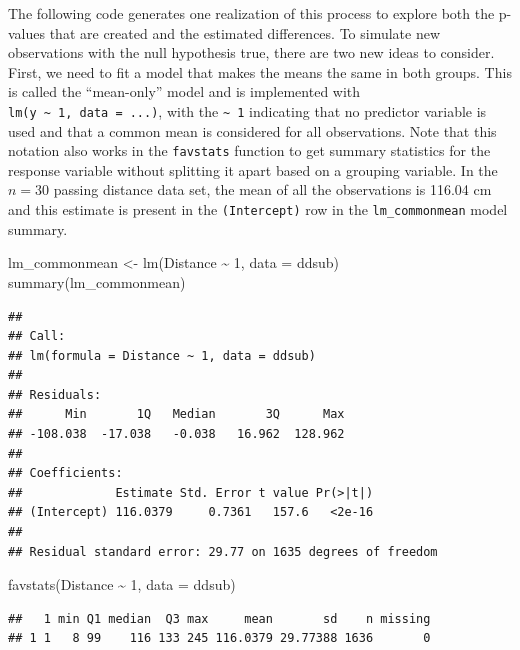 \documentclass[
]{book}
\newenvironment{Shaded}{\begin{snugshade}}{\end{snugshade}}
\newcommand{\AttributeTok}[1]{\textcolor[rgb]{0.77,0.63,0.00}{#1}}
\newcommand{\DecValTok}[1]{\textcolor[rgb]{0.00,0.00,0.81}{#1}}
\newcommand{\FunctionTok}[1]{\textcolor[rgb]{0.00,0.00,0.00}{#1}}
\newcommand{\NormalTok}[1]{#1}
\newcommand{\OtherTok}[1]{\textcolor[rgb]{0.56,0.35,0.01}{#1}}
\newcommand{\SpecialCharTok}[1]{\textcolor[rgb]{0.00,0.00,0.00}{#1}}
\begin{document}
\indent The following code generates one realization of this process to explore both the p-values that are created and the estimated differences. To simulate new observations with the null hypothesis true, there are two new ideas to consider. First, we need to fit a model that makes the means the same in both groups. This is called the ``mean-only'' model  and is implemented with \texttt{lm(y\ \textasciitilde{}\ 1,\ data\ =\ ...)}, with the \texttt{\textasciitilde{}\ 1} indicating that no predictor variable is used and that a common mean is considered for all observations. Note that this notation also works in the \texttt{favstats} function to get summary statistics for the response variable without splitting it apart based on a grouping variable. In the \(n = 30\) passing distance data set, the mean of all the observations is 116.04 cm and this estimate is present in the \texttt{(Intercept)} row in the \texttt{lm\_commonmean} model summary.

\begin{Shaded}
\begin{Highlighting}[]
\NormalTok{lm\_commonmean }\OtherTok{\textless{}{-}} \FunctionTok{lm}\NormalTok{(Distance }\SpecialCharTok{\textasciitilde{}} \DecValTok{1}\NormalTok{, }\AttributeTok{data =}\NormalTok{ ddsub)}
\FunctionTok{summary}\NormalTok{(lm\_commonmean)}
\end{Highlighting}
\end{Shaded}

\begin{verbatim}
## 
## Call:
## lm(formula = Distance ~ 1, data = ddsub)
## 
## Residuals:
##      Min       1Q   Median       3Q      Max 
## -108.038  -17.038   -0.038   16.962  128.962 
## 
## Coefficients:
##             Estimate Std. Error t value Pr(>|t|)
## (Intercept) 116.0379     0.7361   157.6   <2e-16
## 
## Residual standard error: 29.77 on 1635 degrees of freedom
\end{verbatim}

\begin{Shaded}
\begin{Highlighting}[]
\FunctionTok{favstats}\NormalTok{(Distance }\SpecialCharTok{\textasciitilde{}} \DecValTok{1}\NormalTok{, }\AttributeTok{data =}\NormalTok{ ddsub)}
\end{Highlighting}
\end{Shaded}

\begin{verbatim}
##   1 min Q1 median  Q3 max     mean       sd    n missing
## 1 1   8 99    116 133 245 116.0379 29.77388 1636       0
\end{verbatim}
\end{document}
